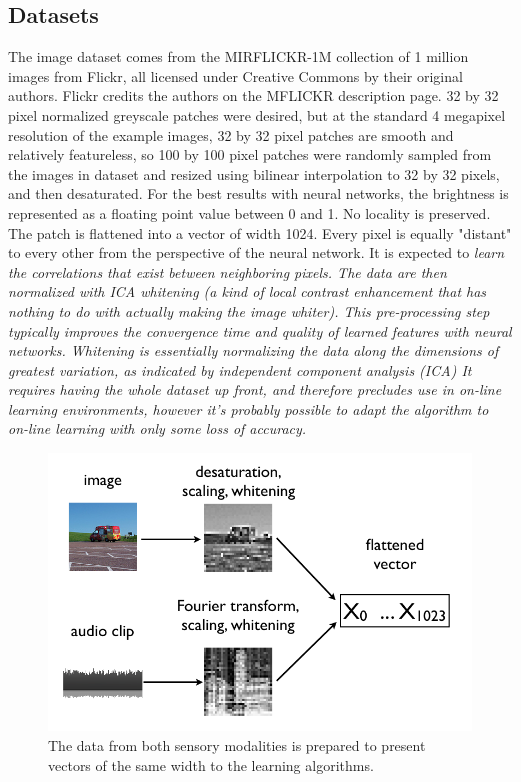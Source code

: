 \documentclass[12pt]{article}
\begin{document}
\begin{doublespacing}
	\subsection{Datasets}
	The image dataset comes from the MIRFLICKR-1M collection of 1 million images from Flickr, all licensed under Creative Commons by their original authors. Flickr credits the authors on the MFLICKR description page. 32 by 32 pixel normalized greyscale patches were desired, but at the standard 4 megapixel resolution of the example images, 32 by 32 pixel patches are smooth and relatively featureless, so 100 by 100 pixel patches were randomly sampled from the images in dataset and resized using bilinear interpolation to 32 by 32 pixels, and then desaturated. For the best results with neural networks, the brightness is represented as a floating point value between 0 and 1. No locality is preserved. The patch is flattened into a vector of width 1024. Every pixel is equally "distant" to every other from the perspective of the neural network. It is expected to \em learn \em the correlations that exist between neighboring pixels. The data are then normalized with ICA whitening (a kind of local contrast enhancement that has nothing to do with actually making the image whiter). This pre-processing step typically improves the convergence time and quality of learned features with neural networks. Whitening is essentially normalizing the data along the dimensions of greatest variation, as indicated by independent component analysis (ICA) It requires having the whole dataset up front, and therefore precludes use in on-line learning environments, however it's probably possible to adapt the algorithm to on-line learning with only some loss of accuracy.
	
\begin{figure}[p]
\centering
\includegraphics[width=6in]{data_prep}
\caption{The data from both sensory modalities is prepared to present vectors of the same width to the learning algorithms.}
\end{figure}


\end{doublespacing}
\end{document}
